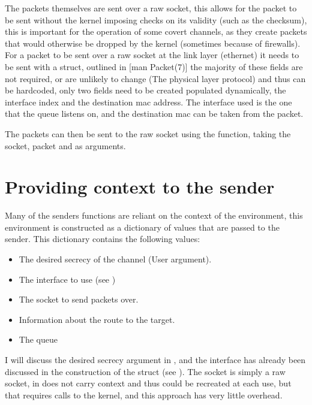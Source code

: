 The packets themselves are sent over a raw socket, this allows for the packet to be sent without the kernel imposing checks on its validity (such as the checksum), this is important for the operation of some covert channels, as they create packets that would otherwise be dropped by the kernel (sometimes because of firewalls). For a packet to be sent over a raw socket at the link layer (ethernet) it needs to be sent with a  struct, outlined in [man Packet(7)] the majority of these fields are not required, or are unlikely to change (The physical layer protocol) and thus can be hardcoded, only two fields need to be created populated dynamically, the interface index and the destination mac address. The interface used is the one that the queue listens on, and the destination mac can be taken from the packet.

The packets can then be sent to the raw socket using the  function, taking the socket, packet and  as arguments.

\section{Providing context to the sender}
\label{sec:context}

Many of the senders functions are reliant on the context of the environment, this environment is constructed as a dictionary of values that are passed to the sender. This dictionary contains the following values:

\begin{itemize}
    \item The desired secrecy of the channel (User argument).
    \item The interface to use (see )
    \item The socket to send packets over.
    \item Information about the route to the target.
    \item The queue
\end{itemize}

I will discuss the desired secrecy argument in , and the interface has already been discussed in the construction of the  struct (see ). The socket is simply a raw socket, in does not carry context and thus could be recreated at each use, but that requires calls to the kernel, and this approach has very little overhead.

